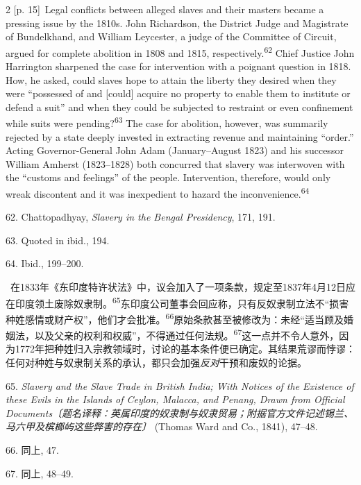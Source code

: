 \documentclass[10pt,a4paper]{article}
\begin{document}
\begin{paracol}{2}
{\scriptsize\color{gray} [p. 15]}\ Legal conflicts between alleged slaves and their masters became a pressing issue by the 1810s. John Richardson, the District Judge and Magistrate of Bundelkhand, and William Leycester, a judge of the Committee of Circuit, argued for complete abolition in 1808 and 1815, respectively.\nobreak\textsuperscript{62} Chief Justice John Harrington sharpened the case for intervention with a poignant question in 1818. How, he asked, could slaves hope to attain the liberty they desired when they were “possessed of and [could] acquire no property to enable them to institute or defend a suit” and when they could be subjected to restraint or even confinement while suits were pending?\nobreak\textsuperscript{63} The case for abolition, however, was summarily rejected by a state deeply invested in extracting revenue and maintaining “order.” Acting Governor-General John Adam (January–August 1823) and his successor William Amherst (1823–1828) both concurred that slavery was interwoven with the “customs and feelings” of the people. Intervention, therefore, would only wreak discontent and it was inexpedient to hazard the inconvenience.\nobreak\textsuperscript{64}\par{\small 62. Chattopadhyay, \textit{Slavery in the Bengal Presidency}, 171, 191.\par}{\small 63. Quoted in ibid., 194.\par}{\small 64. Ibid., 199–200.\par}
\switchcolumn*
{\scriptsize\color{gray} [p. 15]}\ 在1833年《东印度特许状法》中，议会加入了一项条款，规定至1837年4月12日应在印度领土废除奴隶\mbox{制。\textsuperscript{65}}东印度公司董事会回应称，只有反奴隶制立法不“损害种姓感情或财产权”，他们才会批\mbox{准。\textsuperscript{66}}原始条款甚至被修改为：未经“适当顾及婚姻法，以及父亲的权利和权威”，不得通过任何法\mbox{规。\textsuperscript{67}}这一点并不令人意外，因为1772年把种姓归入宗教领域时，讨论的基本条件便已确定。其结果荒谬而悖谬：任何对种姓与奴隶制关系的承认，都只会加强\textit{反对}干预和废奴的论据。\par{\small 65. \textit{Slavery and the Slave Trade in British India; With Notices of the Existence of these Evils in the Islands of Ceylon, Malacca, and Penang, Drawn from Official Documents〔题名译释：英属印度的奴隶制与奴隶贸易；附据官方文件记述锡兰、马六甲及槟榔屿这些弊害的存在〕} (Thomas Ward and Co., 1841), 47–48.\par}{\small 66. 同上, 47.\par}{\small 67. 同上, 48–49.\par}

\end{paracol}
\end{document}
